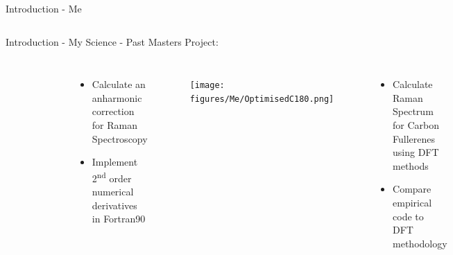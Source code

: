 \begin{frame}{Introduction - Me}
\begin{columns}
\end{columns}
\end{frame}

\begin{frame}{Introduction - My Science - Past}
Masters Project:
\begin{columns}
\begin{figure}
\includegraphics[width=0.7\textwidth]{figures/Me/harmonicoscilator}
\end{figure}
\begin{itemize}
	\item Calculate an anharmonic correction for Raman Spectroscopy
	\item Implement 2\textsuperscript{nd} order numerical derivatives in Fortran90
\end{itemize}

\begin{figure}
\texttt{[image: figures/Me/OptimisedC180.png]}
\end{figure}
\begin{itemize}
	\item Calculate Raman Spectrum for Carbon Fullerenes using DFT methods
	\item Compare empirical code to DFT methodology
\end{itemize}

\end{columns}
\end{frame}

